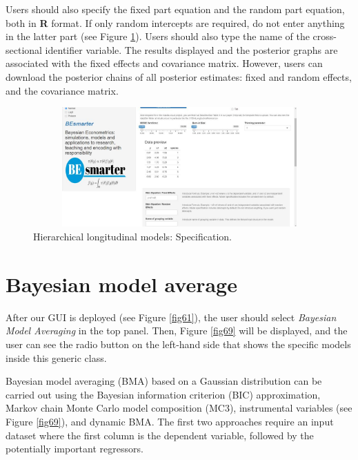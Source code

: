Users should also specify the fixed part equation and the random part equation, both in \textbf{R} format. If only random intercepts are required, do not enter anything in the latter part (see Figure \ref{fig68}). Users should also type the name of the cross-sectional identifier variable. The results displayed and the posterior graphs are associated with the fixed effects and covariance matrix. However, users can download the posterior chains of all posterior estimates: fixed and random effects, and the covariance matrix.

\begin{figure}
	\includegraphics[width=340pt, height=130pt]{Chapters/chapterGUI/figures/Figure8.jpg}
	\caption[List of figure caption goes here]{Hierarchical longitudinal models: Specification.}\label{fig68}
\end{figure} 

\section{Bayesian model average}\label{secGUI6}

After our GUI is deployed (see Figure \ref{fig61}), the user should select \textit{Bayesian Model Averaging} in the top panel. Then, Figure \ref{fig69} will be displayed, and the user can see the radio button on the left-hand side that shows the specific models inside this generic class.

Bayesian model averaging (BMA) based on a Gaussian distribution can be carried out using the Bayesian information criterion (BIC) approximation, Markov chain Monte Carlo model composition (MC3), instrumental variables (see Figure \ref{fig69}), and dynamic BMA. The first two approaches require an input dataset where the first column is the dependent variable, followed by the potentially important regressors.

